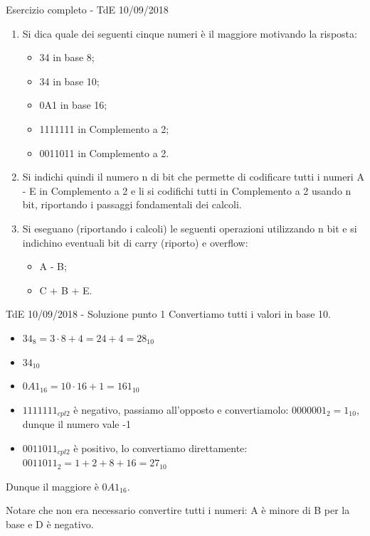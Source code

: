 \documentclass[9pt, format=169, handout]{beamer}
\begin{document}
\begin{frame}{Esercizio completo - TdE 10/09/2018}
\begin{enumerate}
	\item Si dica quale dei seguenti cinque numeri è il maggiore motivando la risposta:
	\begin{itemize}
		\item 34 in base 8;
		\item 34 in base 10;
		\item 0A1 in base 16;
		\item 1111111 in Complemento a 2;
		\item 0011011 in Complemento a 2.
	\end{itemize}
	
	\item Si indichi quindi il numero n di bit che permette di codificare tutti i numeri A - E in Complemento a 2 e li si codifichi tutti in Complemento a 2 usando n bit, riportando i passaggi fondamentali dei calcoli.
	
	\item Si eseguano (riportando i calcoli) le seguenti operazioni utilizzando n bit e si indichino eventuali bit di carry (riporto) e overflow:
	\begin{itemize}
		\item A - B;
		\item C + B + E.
	\end{itemize}
\end{enumerate}
\end{frame}

\begin{frame}{TdE 10/09/2018 - Soluzione punto 1}
Convertiamo tutti i valori in base 10.
	\begin{itemize}
		\item $34_8 = 3 \cdot 8 +  4 = 24+4 = 28_{10}$
		\item $34_{10}$
		\item $0A1_{16} = 10 \cdot 16 + 1 = 161_{10}$
		\item $1111111_{cpl2}$ è negativo, passiamo all'opposto e convertiamolo: $0000001_2 = 1_{10}$, dunque il numero vale -1
		\item $0011011_{cpl2}$ è positivo, lo convertiamo direttamente: $0011011_2 = 1+2+8+16 = 27_{10}$
	\end{itemize}

Dunque il maggiore è $0A1_{16}$.

Notare che non era necessario convertire tutti i numeri: A è minore di B per la base e D è negativo.
\end{frame}
\end{document}
